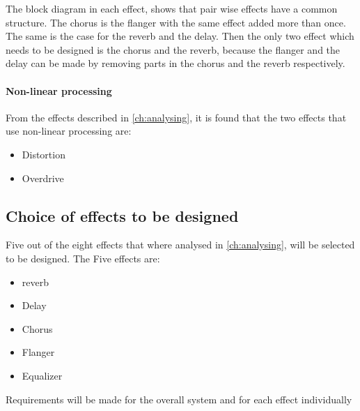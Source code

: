 The block diagram in each effect, shows that pair wise effects have a common structure. The chorus is the flanger with the same effect added more than once. The same is the case for the \gls{reverb} and the delay. Then the only two effect which needs to be designed is the chorus and the \gls{reverb}, because the flanger and the delay can be made by removing parts in the chorus and the \gls{reverb} respectively.

\paragraph{Non-linear processing}
From the effects described in \autoref{ch:analysing}, it is found that the two effects that use non-linear processing are:
\begin{itemize}
	\item Distortion
	\item Overdrive
\end{itemize} 

\subsection{Choice of effects to be designed}
Five out of the eight effects that where analysed in \autoref{ch:analysing}, will be selected to be designed. The Five effects are:
\begin{itemize}
	\item \gls{reverb}
	\item Delay
	\item Chorus
	\item Flanger
	\item Equalizer
\end{itemize}

Requirements will be made for the overall system and for each effect individually 
 
 
